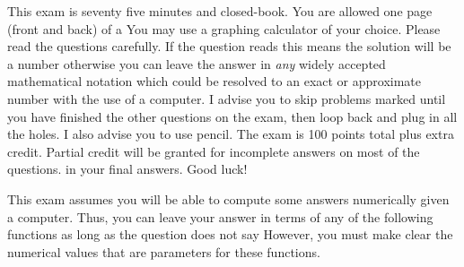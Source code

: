 \documentclass[12pt]{article}
\begin{document}
This exam is seventy five minutes and closed-book. You are allowed one page (front and back) of a  You may use a graphing calculator of your choice. Please read the questions carefully. If the question reads  this means the solution will be a number otherwise you can leave the answer in \textit{any} widely accepted mathematical notation which could be resolved to an exact or approximate number with the use of a computer. I advise you to skip problems marked  until you have finished the other questions on the exam, then loop back and plug in all the holes. I also advise you to use pencil. The exam is 100 points total plus extra credit. Partial credit will be granted for incomplete answers on most of the questions.  in your final answers. Good luck!

\pagebreak

This exam assumes you will be able to compute some answers numerically given a computer. Thus, you can leave your answer in terms of any of the following functions as long as the question does not say  However, you must make clear the numerical values that are parameters for these functions.
\end{document}
